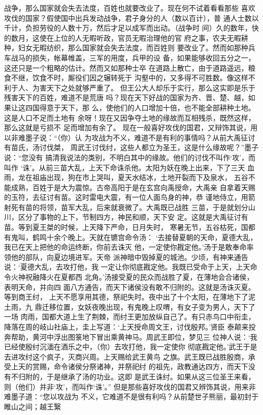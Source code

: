 \documentclass[12pt,UTF8]{ctexbook}
\begin{document}
战争，那么国家就会失去法度，百姓也就要改业了。现在何不试着看看那些 
喜欢攻伐的国家？假使国中出兵发动战争，君子身分的人（数以百计），普 
通人士数以千计，负担劳役的人数十万，然后才足以成军而出动。（战争时 
间）久的数年，快的数月，这使在上位的人无暇听政，官员无暇治理他的官 
府之事，农夫无暇耕种，妇女无暇纺织，那么国家就会失去法度，而百姓则 
要改业了。然而如那种兵车战马的损失，帐幕帷盖，三军的用度，兵甲的设 
备，如果能够收回五分之一，这还只是一个粗略的估计。然而又如那种士卒 
在道路上散亡，由于道路遥远，粮食不继，饮食不时，厮役们因之辗转死于 
沟壑中的，又多得不可胜数。像这样不利于人、为害天下之处就够严重了。 
但王公大人却乐于实行，那么这实即是乐于残害天下的百姓，难道不是荒唐 
吗？现在天下好战的国家为齐、晋、楚、越，如果让这四国得意于天下，那 
么，使他们的人口增加十倍，也不能全部耕种土地。这是人口不足而土地有 
余呀！现在又因争夺土地的缘故而互相残杀，既然这样，那么这就是亏损不 
足而增加有余了。 
现在一般喜好攻伐的国君，又辩饰其说，用以非难墨子说：“（你）认 
为攻战为不义，难道不是有利的事情吗？从前大禹征讨有苗氏，汤讨伐桀， 
周武王讨伐纣，这些人都立为圣王，这是什么缘故呢？”墨子说：“您没有 
搞清我说法的类别，不明白其中的缘故。他们的讨伐不叫作‘攻’，而叫作 
‘诛’。从前三苗大乱，上天下命诛杀他。太阳为妖在晚上出来，下了三天 
血雨，龙在祖庙出现，狗在市上哭叫，夏天水结冰，土地开裂而下及泉水， 
五谷不能成熟，百姓于是大为震惊。古帝高阳于是在玄宫向禹授命，大禹亲 
自拿着天赐的玉符，去征讨有苗。这时雷电大震，有一位人面鸟身的神，恭 
谨地侍立，用箭射死有苗的将领，苗军大乱，后来就衰微了。大禹既已战胜 
三苗，于是就划分山川，区分了事物的上下，节制四方，神民和顺，天下安 
定。这就是大禹征讨有苗。等到夏王桀的时候，上天降下严命，日月失时， 
寒暑无节，五谷枯死，国都有鬼叫，鹤鸣十余个晚上。天就在镳宫命令汤： 
‘去接替夏朝的天命，夏德大乱，我已在天上把他的命运终断，你前去诛灭 
他，一定使你戡定他。’汤于是敢奉命率领他的部队，向夏边境进军。天帝 
派神暗中毁掉夏的城池。少顷，有神来通告说：‘夏德大乱，去攻打他，我 
一定让你彻底戡定他。我既已受命于上天，上天命令火神祝融降火在夏都西 
北角。’汤接受夏的民众而战胜了夏，在薄地会合诸侯，表明天命，并向四 
面八方通告，而天下诸侯没有敢不归附的。这就是汤诛灭夏。等到商王纣， 
上天不愿享用其德，祭祀失时。夜中出了十个太阳，在薄地下了泥土雨，九 
鼎迁移位置，女妖夜晚出现，有鬼晚上叹喟，有女子变为男人，天下了一场 
肉雨，国都大道上生了荆棘，而纣王更加放纵自己了。有只赤鸟口中衔圭， 
降落在周的岐山社庙上，圭上写道：‘上天授命周文王，讨伐殷邦。’贤臣 
泰颠来投奔帮助，黄河中浮出图箓地下冒出乘黄神马。周武王即位，梦见三 
位神人说：‘我已经使殷纣沉湎在酒乐之中，（你）去攻打他，我一定使你 
彻底戡定他。’武王于是去进攻纣这个疯子，灭商兴周。上天赐给武王黄鸟 
之旗。武王既已战胜殷商，承受上天的赏赐，命令诸侯分祭诸神，并祭祀纣 
的祖先，政教通达四方，而天下没有不归附的，于是继承了汤的功业。这即 
是武王诛纣。如果从这三位圣王来看，则（他们）并非‘攻’，而叫作‘诛’。” 
但是那些喜好攻伐的国君又辨饰其说，用来非难墨子道：“您以攻战为 
不义，它难道不是很有利吗？从前楚世子熊丽，最初封于睢山之间；越王繄 
\end{document}
